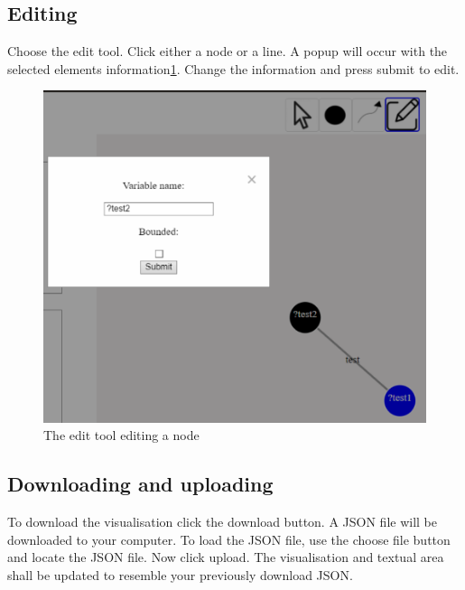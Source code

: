 \subsection{Editing}
Choose the edit tool. Click either a node or a line. A popup will occur with the selected elements information\ref{fig:user-edit}. Change the information and press submit to edit.
\begin{figure}[H]
    \centering
    \includegraphics{figures/user-edit.pdf}
    \caption{The edit tool editing a node}
    \label{fig:user-edit}
\end{figure}
\subsection{Downloading and uploading}
To download the visualisation click the download button. A JSON file will be downloaded to your computer. To load the JSON file, use the choose file button and locate the JSON file. Now click upload. The visualisation and textual area shall be updated to resemble your previously download JSON.
